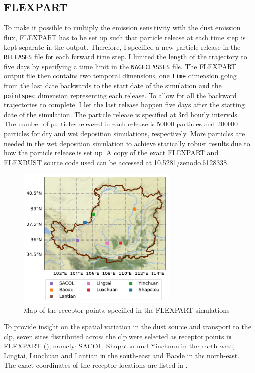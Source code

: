 \subsection{FLEXPART}
To make it possible to multiply the emission sensitivity with the dust emission flux, FLEXPART has to be set up such that particle release at each time step is kept separate in the output. 
Therefore, I  specified a new particle release in the \verb|RELEASES| file for each forward time step. I limited the length of the trajectory to five days by specifying a time limit in the \verb|NAGECLASSES| file.
The FLEXPART output file then contains two temporal dimensions, one \verb|time| dimension going from the last date backwards to the start date of the simulation and the \verb|pointspec| dimension representing each release. 
To allow for all the backward trajectories to complete, I let the last release happen five days after the starting date of the simulation.   
The particle release is specified at 3rd hourly intervals. The number of particles released in each release is 50000 particles and 200000 particles for dry and wet deposition simulations, respectively. 
More particles are needed in the wet deposition simulation to achieve statically robust results due to how the particle release is set up.  
A copy of the exact FLEXPART and FLEXDUST source code used can be accessed at \url{10.5281/zenodo.5128338}. 
\begin{figure}[htpb]
    \centering
    \includegraphics[width=0.7\textwidth]{texfiles/figs/map_loess.pdf}
    \caption{Map of the receptor points, specified in the FLEXPART simulations}
    \label{fig:maps_clp_location}
\end{figure}

To provide insight on the spatial variation in the dust source and transport to the \acrshort{clp}, seven sites distributed across the \acrshort{clp} were selected as receptor points in FLEXPART  (), namely: SACOL, Shapotou and Yinchuan in the north-west, Lingtai, Luochuan and Lantian in the south-east and Baode in the north-east. 
The exact coordinates of the receptor locations are listed in . 



